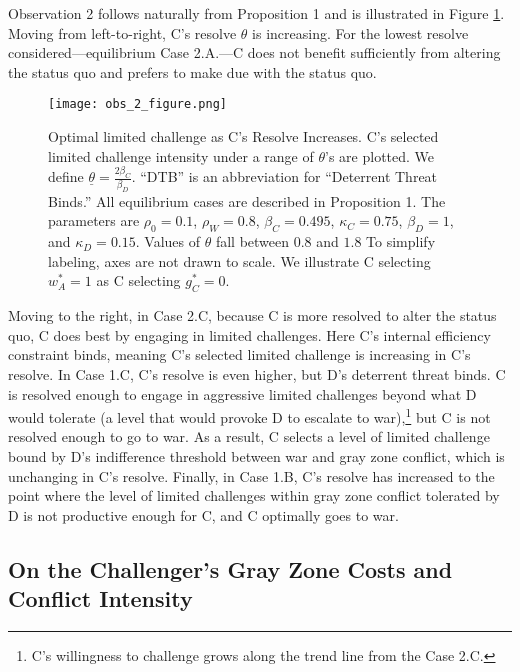 \documentclass[
]{article}
\begin{document}
Observation 2 follows naturally from Proposition 1 and is illustrated in Figure \ref{fig:optimalresolveincrease}. Moving from left-to-right, C's resolve \(\theta\) is increasing. For the lowest resolve considered---equilibrium Case 2.A.---C does not benefit sufficiently from altering the status quo and prefers to make due with the status quo.

\begin{figure}[h]
      \centering
        \texttt{[image: obs\_2\_figure.png]}
        \caption{Optimal limited challenge as C's Resolve Increases. C's selected limited challenge intensity under a range of $\theta$'s are plotted. We define $\underline{\theta}=\frac{2\beta_{C}}{\beta_{D}}$. ``DTB'' is an abbreviation for ``Deterrent Threat Binds.'' All equilibrium cases are described in Proposition 1. The parameters are $\rho_0=0.1$, $\rho_W=0.8$, $\beta_C=0.495$, $\kappa_{C}=0.75$, $\beta_D=1$, and $\kappa_D=0.15$. Values of $\theta$ fall between $0.8$ and $1.8$ To simplify labeling, axes are not drawn to scale. We illustrate C selecting $w_{A}^{*}=1$ as C selecting $g_{C}^{*}=0.$}
    \label{fig:optimalresolveincrease}
    \end{figure}

Moving to the right, in Case 2.C, because C is more resolved to alter the status quo, C does best by engaging in limited challenges. Here C's internal efficiency constraint binds, meaning C's selected limited challenge is increasing in C's resolve. In Case 1.C, C's resolve is even higher, but D's deterrent threat binds. C is resolved enough to engage in aggressive limited challenges beyond what D would tolerate (a level that would provoke D to escalate to war),\footnote{C's willingness to challenge grows along the trend line from the Case 2.C.} but C is not resolved enough to go to war. As a result, C selects a level of limited challenge bound by D's indifference threshold between war and gray zone conflict, which is unchanging in C's resolve. Finally, in Case 1.B, C's resolve has increased to the point where the level of limited challenges within gray zone conflict tolerated by D is not productive enough for C, and C optimally goes to war.

\hypertarget{on-the-challengers-gray-zone-costs-and-conflict-intensity}{%
\subsection{On the Challenger's Gray Zone Costs and Conflict Intensity}\label{on-the-challengers-gray-zone-costs-and-conflict-intensity}}
\end{document}
